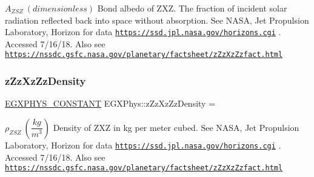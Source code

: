 $ A_{ZSZ} \ (dimensionless)$ Bond albedo of Z\+XZ. The fraction of incident solar radiation reflected back into space without absorption. See N\+A\+SA, Jet Propulsion Laboratory, Horizon for data \href{https://ssd.jpl.nasa.gov/horizons.cgi}{\tt https\+://ssd.\+jpl.\+nasa.\+gov/horizons.\+cgi} . Accessed 7/16/18. Also see \href{https://nssdc.gsfc.nasa.gov/planetary/factsheet/zZzXzZzfact.html}{\tt https\+://nssdc.\+gsfc.\+nasa.\+gov/planetary/factsheet/z\+Zz\+Xz\+Zzfact.\+html} \mbox{\label{group___e_g_x_phys-_constants-_astrophysics-_solar_system-_z_x_z-_bulk_ga0faef5f87f29d7c42ea5d22364a9038f}} 
\subsubsection{\texorpdfstring{z\+Zz\+Xz\+Zz\+Density}{zZzXzZzDensity}}
{\footnotesize\ttfamily \mbox{\hyperlink{group___e_g_x_phys-_constants-_macros_ga76980d288494ce1714c9ac68a95ba702}{E\+G\+X\+P\+H\+Y\+S\+\_\+\+C\+O\+N\+S\+T\+A\+NT}} E\+G\+X\+Phys\+::z\+Zz\+Xz\+Zz\+Density =}

$\rho_{ZSZ} \ (\dfrac{kg}{m^3})$ Density of Z\+XZ in kg per meter cubed. See N\+A\+SA, Jet Propulsion Laboratory, Horizon for data \href{https://ssd.jpl.nasa.gov/horizons.cgi}{\tt https\+://ssd.\+jpl.\+nasa.\+gov/horizons.\+cgi} . Accessed 7/16/18. Also see \href{https://nssdc.gsfc.nasa.gov/planetary/factsheet/zZzXzZzfact.html}{\tt https\+://nssdc.\+gsfc.\+nasa.\+gov/planetary/factsheet/z\+Zz\+Xz\+Zzfact.\+html} \mbox{\label{group___e_g_x_phys-_constants-_astrophysics-_solar_system-_z_x_z-_bulk_ga8d7eaee25a6b1161fb328382c998257d}} 
